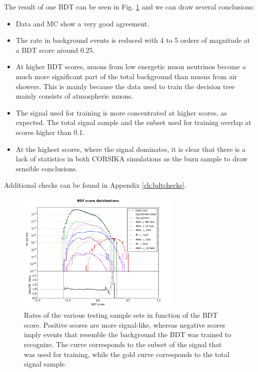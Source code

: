 \noindent The result of one BDT can be seen in Fig. \ref{fig:singlebdtrate} and we can draw several conclusions:
\vspace{2mm}
\begin{itemize}
\item Data and MC show a very good agreement.
\item The rate in background events is reduced with 4 to 5 orders of magnitude at a BDT score around 0.25.
\item At higher BDT scores, muons from low energetic muon neutrinos become a much more significant part of the total background than muons from air showers. This is mainly because the data used to train the decision tree mainly consists of atmospheric muons.
\item The signal used for training is more concentrated at higher scores, as expected. The total signal sample and the subset used for training overlap at scores higher than 0.1.
\item At the highest scores, where the signal dominates, it is clear that there is a lack of statistics in both CORSIKA simulations as the burn sample to draw sensible conclusions.
\end{itemize}
\vspace{2mm}
Additional checks can be found in Appendix \ref{ch:bdtchecks}.\\

\begin{figure}
\centering
\includegraphics[width = 0.7\textwidth]{chapter8/img/dist_vs_bdt_result2_signal_m_100_charge1ovr2_better.png}
\caption{Rates of the various testing sample sets in function of the BDT score. Positive scores are more signal-like, whereas negative scores imply events that resemble the background the BDT was trained to recognize. The curve corresponds to the subset of the signal that was used for training, while the gold curve corresponds to the total signal sample.}
\label{fig:singlebdtrate}
\end{figure}

